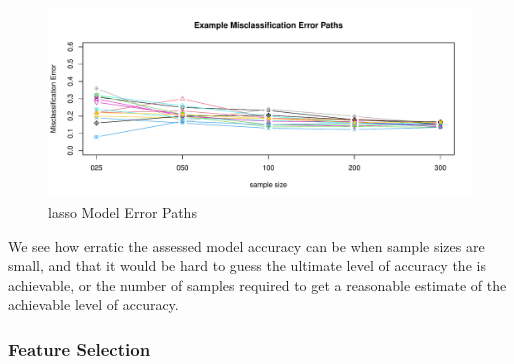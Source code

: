\documentclass[
]{book}
\begin{document}
\begin{figure}
\centering
\includegraphics{Static/figures/brca-glmnetSuite-lasso-simRes-errorsPath-overSim-1.pdf}
\caption{\label{fig:brca-glmnetSuite-lasso-simRes-errorsPath-overSim}lasso Model Error Paths}
\end{figure}

We see how erratic the assessed model accuracy can be when sample sizes are small,
and that it would be hard to guess the ultimate level of accuracy the
is achievable, or the number of samples required to get a reasonable
estimate of the achievable level of accuracy.

\hypertarget{feature-selection-3}{%
\subsubsection{Feature Selection}\label{feature-selection-3}}
\end{document}
